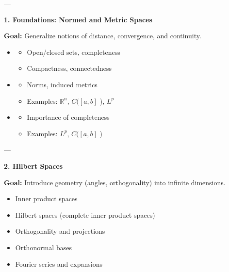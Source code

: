 \documentclass[12pt,a4paper]{report}
\begin{document}
---
\begin{description}

\item \textbf{1. Foundations: Normed and Metric Spaces}

\item \textbf{Goal:} Generalize notions of distance, convergence, and continuity.

\begin{itemize}
    \item {}

	\begin{itemize}
        \item Open/closed sets, completeness
        \item Compactness, connectedness
	\end{itemize}

    \item {}

	\begin{itemize}
        \item Norms, induced metrics
        \item Examples: $ \mathbb{R}^n $, $ C([a,b]$ ), $ L^p $
	\end{itemize}

    \item {}

	\begin{itemize}
        \item Importance of completeness
        \item Examples: $ L^p $, $ C([a,b]$ )
	\end{itemize}

\end{itemize}
---

\item \textbf{2. Hilbert Spaces}

\item \textbf{Goal:} Introduce geometry (angles, orthogonality) into infinite dimensions.

\begin{itemize}
    \item Inner product spaces
    \item Hilbert spaces (complete inner product spaces)
    \item Orthogonality and projections
    \item Orthonormal bases
    \item Fourier series and expansions
\end{itemize}


\end{description}
\end{document}
